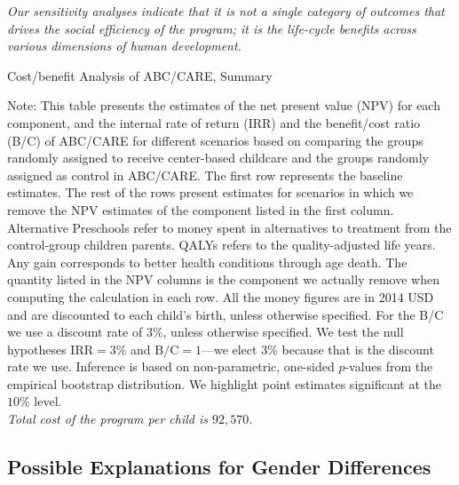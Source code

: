 \textit{Our sensitivity analyses indicate that it is not a single category of outcomes that drives the social efficiency of the program; it is the life-cycle benefits across various dimensions of human development.}

\begin{table}[!htbp]
\centering
\caption{Cost/benefit Analysis of ABC/CARE, Summary}\label{table:cba}
\begin{adjustbox}{max width=\textwidth}
\begin{threeparttable}

\begin{tablenotes}
\footnotesize
\item Note: This table presents the estimates of the net present value (NPV) for each component, and the internal rate of return (IRR) and the benefit/cost ratio (B/C) of ABC/CARE for different scenarios based on comparing the groups randomly assigned to receive center-based childcare and the groups randomly assigned as control in ABC/CARE. The first row represents the baseline estimates. The rest of the rows present estimates for scenarios in which we remove the NPV estimates of the component listed in the first column. Alternative Preschools refer to money spent in alternatives to treatment from the control-group children parents. QALYs refers to the quality-adjusted life years. Any gain corresponds to better health conditions through age death. The quantity listed in the NPV columns is the component we actually remove when computing the calculation in each row. All the money figures are in 2014 USD and are discounted to each child's birth, unless otherwise specified. For the B/C we use a discount rate of $3\%$, unless otherwise specified. We test the null hypotheses $\text{IRR} = 3\%$ and $\text{B/C} = 1$---we elect $3\%$ because that is the discount rate we use. Inference is based on non-parametric, one-sided $p$-values from the empirical bootstrap distribution. We highlight point estimates significant at the $10\%$ level.\\
\textit{Total cost of the program per child is $92,570$.}
\end{tablenotes}
\end{threeparttable}
\end{adjustbox}
\end{table}

\subsection{Possible Explanations for Gender Differences}

